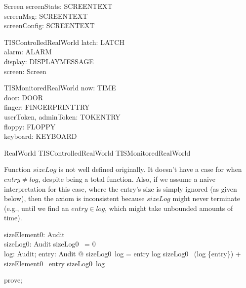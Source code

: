 \begin{schema}{Screen}
  screenStats: SCREENTEXT\\
  screenMsg: SCREENTEXT\\
  screenConfig: SCREENTEXT
\end{schema}

\begin{schema}{TISControlledRealWorld}
  latch: LATCH\\
  alarm: ALARM\\
  display: DISPLAYMESSAGE\\
  screen: Screen
\end{schema}

\begin{schema}{TISMonitoredRealWorld}
  now: TIME\\
  door: DOOR\\
  finger: FINGERPRINTTRY\\
  userToken, adminToken: TOKENTRY\\
  floppy: FLOPPY\\
  keyboard: KEYBOARD
\end{schema}

\begin{zed}
RealWorld  TISControlledRealWorld \land  TISMonitoredRealWorld
\end{zed}

Function $sizeLog$ is not well defined originally. It doesn't have
a case for when $entry \neq log$, despite being a total function.
Also, if we assume a naive interpretation for this case, where the
entry's size is simply ignored (as given below), then the axiom is
inconsistent because $sizeLog$ might never terminate (e.g., until we
find an $entry \in log$, which might take unbounded amounts of time).
%
\begin{axdef}
  sizeElement0: Audit \fun  \nat \\
  sizeLog0: \finset  Audit \fun  \nat
\where
     sizeLog0~ \emptyset = 0
    \\
    \forall log: \finset Audit; entry: Audit @ sizeLog0~log =
        \IF entry \in log \THEN sizeLog0~ (log \setminus \{entry\}) + sizeElement0~ entry
        \ELSE sizeLog0~log
\end{axdef}

\begin{zproof}
prove;
\end{zproof}

